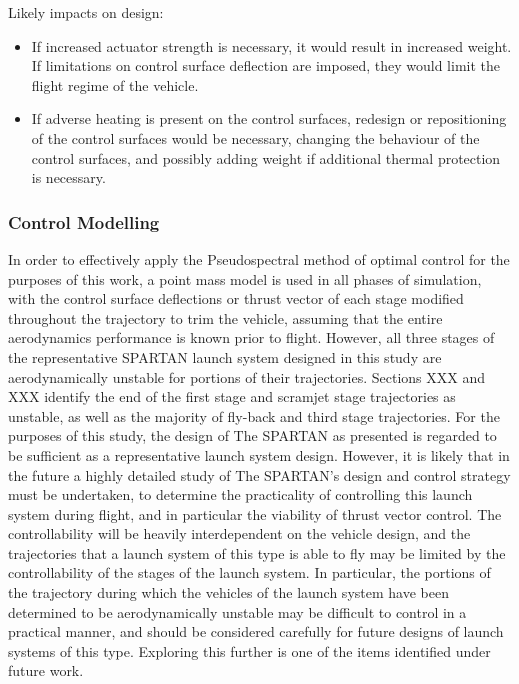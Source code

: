 Likely impacts on design:
\begin{itemize}[noitemsep,topsep=0pt]
	\item If increased actuator strength is necessary, it would result in increased weight. If limitations on control surface deflection are imposed, they would limit the flight regime of the vehicle. 
	\item If adverse heating is present on the control surfaces, redesign or repositioning of the control surfaces would be necessary, changing the behaviour of the control surfaces, and possibly adding weight if additional thermal protection is necessary.
\end{itemize}


\subsubsection{Control Modelling}
In order to effectively apply the Pseudospectral method of optimal control for the purposes of this work, a point mass model is used in all phases of simulation, with the control surface deflections or thrust vector of each stage modified throughout the trajectory to trim the vehicle, assuming that the entire aerodynamics performance is known prior to flight. However, all three stages of the representative SPARTAN launch system designed in this study are aerodynamically unstable for portions of their trajectories. Sections XXX and XXX identify the end of the first stage and scramjet stage trajectories as unstable, as well as the majority of fly-back and third stage trajectories.
For the purposes of this study, the design of The SPARTAN as presented is regarded to be sufficient as a representative launch system design.
However, it is likely that in the future a highly detailed study of The SPARTAN's design and control strategy must be undertaken, to determine the practicality of controlling this launch system during flight, and in particular the viability of thrust vector control. The controllability will be heavily interdependent on the vehicle design, and the trajectories that a launch system of this type is able to fly may be limited by the controllability of the stages of the launch system. In particular, the portions of the trajectory during which the vehicles of the launch system have been determined to be aerodynamically unstable may be difficult to control in a practical manner, and should be considered carefully for future designs of launch systems of this type. 
Exploring this further is one of the items identified under future work.

